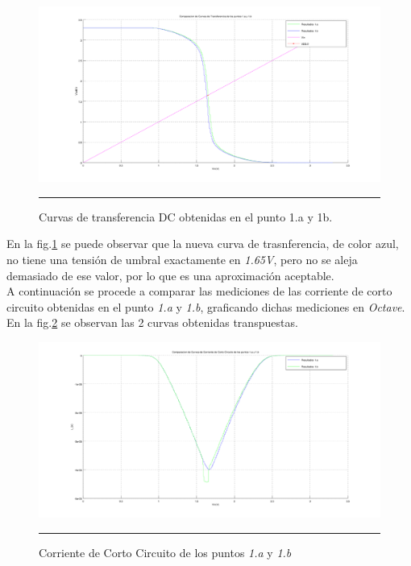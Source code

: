 \documentclass[12pt,a4paper]{article} %
\begin{document}
\begin{figure}[htbp]
  \centering
    \includegraphics[scale=0.25]{./DC_1a_1b.png}
    \rule{35em}{0.3pt}
  \caption[DCim]{Curvas de transferencia DC obtenidas en el punto 1.a y 1b.}
  \label{fig:DC_Comp}
\end{figure}

En la fig.\ref{fig:DC_Comp} se puede observar que la nueva curva de trasnferencia, de color azul, no tiene una tensión de umbral exactamente en \textit{1.65V}, pero no se aleja demasiado de ese valor, por lo que es una aproximación aceptable. \\

A continuación se procede a comparar las mediciones de las corriente de corto circuito obtenidas en el punto \textit{1.a} y \textit{1.b}, graficando dichas mediciones en \textit{Octave}. En la fig.\ref{fig:CC} se observan las 2 curvas obtenidas transpuestas.

\begin{figure}[htbp]
  \centering
    \includegraphics[scale=0.4]{./Comp_Corriente_ICC.png}
    \rule{35em}{0.3pt}
  \caption[CC]{Corriente de Corto Circuito de los puntos \textit{1.a} y \textit{1.b}}
  \label{fig:CC}
\end{figure}
\end{document}
